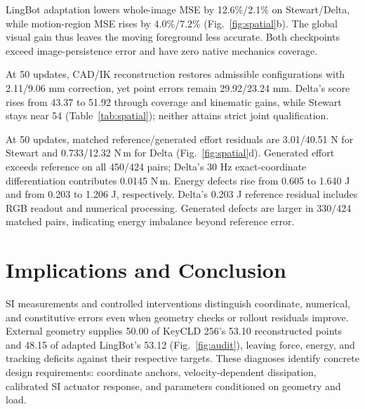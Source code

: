 \documentclass[10pt,twocolumn,letterpaper]{article}
\begin{document}
LingBot adaptation lowers whole-image MSE by 12.6\%/2.1\% on Stewart/Delta, while motion-region MSE rises by 4.0\%/7.2\% (Fig.~\ref{fig:spatial}b). The global visual gain thus leaves the moving foreground less accurate. Both checkpoints exceed image-persistence error and have zero native mechanics coverage.

At 50 updates, CAD/IK reconstruction restores admissible configurations with 2.11/9.06 mm correction, yet point errors remain 29.92/23.24 mm. Delta's score rises from 43.37 to 51.92 through coverage and kinematic gains, while Stewart stays near 54 (Table~\ref{tab:spatial}); neither attains strict joint qualification.

At 50 updates, matched reference/generated effort residuals are 3.01/40.51 N for Stewart and 0.733/12.32 N\,m for Delta (Fig.~\ref{fig:spatial}d). Generated effort exceeds reference on all 450/424 pairs; Delta's 30 Hz exact-coordinate differentiation contributes 0.0145 N\,m. Energy defects rise from 0.605 to 1.640 J and from 0.203 to 1.206 J, respectively. Delta's 0.203 J reference residual includes RGB readout and numerical processing. Generated defects are larger in 330/424 matched pairs, indicating energy imbalance beyond reference error.

\section{Implications and Conclusion}
\label{sec:discussion}
SI measurements and controlled interventions distinguish coordinate, numerical, and constitutive errors even when geometry checks or rollout residuals improve. External geometry supplies 50.00 of KeyCLD 256's 53.10 reconstructed points and 48.15 of adapted LingBot's 53.12 (Fig.~\ref{fig:audit}), leaving force, energy, and tracking deficits against their respective targets. These diagnoses identify concrete design requirements: coordinate anchors, velocity-dependent dissipation, calibrated SI actuator response, and parameters conditioned on geometry and load.
\par
\label{maintextend}
\clearfullpage
{\small


}
\end{document}
